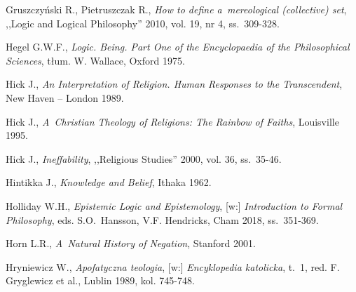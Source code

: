 \begin{thebibliography}{100}
Gruszczyński R., Pietruszczak R., \textit{How to define a~mereological (collective) set}, ,,Logic and Logical Philosophy'' 2010, vol. 19, nr 4, ss.~309-328.



Hegel G.W.F., \textit{Logic. Being. Part One of the Encyclopaedia of the Philosophical Sciences}, tłum. W. Wallace, Oxford 1975.


Hick J., \textit{An Interpretation of Religion. Human Responses to the Transcendent}, New Haven -- London 1989.

Hick J., \textit{A~Christian Theology of Religions: The Rainbow of Faiths}, Louisville 1995.

Hick J., \textit{Ineffability}, ,,Religious Studies'' 2000, vol. 36, ss.~35-46.

Hintikka J., \textit{Knowledge and Belief}, Ithaka 1962.

Holliday W.H., \textit{Epistemic Logic and Epistemology}, [w:] \textit{Introduction to Formal Philosophy}, eds. S.O.~Hansson, V.F. Hendricks, Cham 2018, ss.~351-369.

Horn L.R., \textit{A~Natural History of Negation}, Stanford 2001.

Hryniewicz W., \textit{Apofatyczna teologia}, [w:] \textit{Encyklopedia katolicka}, t.~1, red. F. Gryglewicz et al., Lublin 1989, kol. 745-748.


\end{thebibliography}

